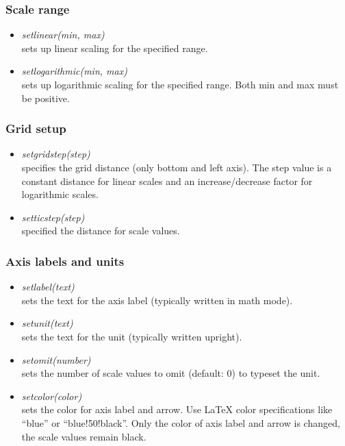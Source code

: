 \documentclass[origlongtable]{scrartcl}
\begin{document}
\subsubsection{Scale range}
\begin{itemize}
\item	\textit{set\textunderscore{}linear(min, max)\/}\\
sets up linear scaling for the specified range.
\item	\textit{set\textunderscore{}logarithmic(min, max)}\\
sets up logarithmic scaling for the specified range.
Both min and max must be positive.
\end{itemize}

\subsubsection{Grid setup}
\begin{itemize}
\item	\textit{set\textunderscore{}grid\textunderscore{}step(step)\/}\\
specifies the grid distance (only bottom and left axis).
The step value is a constant distance for linear scales and an
increase/decrease factor for logarithmic scales.
\item	\textit{set\textunderscore{}tic\textunderscore{}step(step)\/}\\
specified the distance for scale values.
\end{itemize}

\subsubsection{Axis labels and units}
\begin{itemize}
\item	\textit{set\textunderscore{}label(text)\/}\\
sets the text for the axis label (typically written in math mode).
\item	\textit{set\textunderscore{}unit(text)\/}\\
sets the text for the unit (typically written upright).
\item	\textit{set\textunderscore{}omit(number)\/}\\
sets the number of scale values to omit (default: 0) to typeset
the unit.
\item	\textit{set\textunderscore{}color(color)\/}\\
sets the color for axis label and arrow. Use \LaTeX{} color specifications
like ``blue'' or ``blue!50!black''.
Only the color of axis label and arrow is changed, the scale values
remain black.
\end{itemize}
\clearpage
\end{document}
